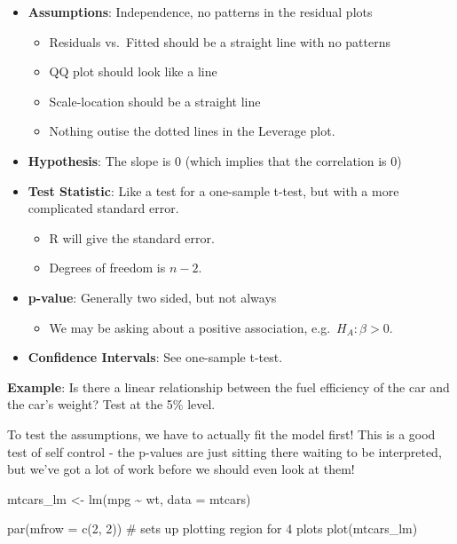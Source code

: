 \documentclass[
  letterpaper,
  DIV=11,
  numbers=noendperiod,
  oneside]{scrreprt}
\newenvironment{Shaded}{\begin{snugshade}}{\end{snugshade}}
\newcommand{\AttributeTok}[1]{\textcolor[rgb]{0.40,0.45,0.13}{#1}}
\newcommand{\CommentTok}[1]{\textcolor[rgb]{0.37,0.37,0.37}{#1}}
\newcommand{\DecValTok}[1]{\textcolor[rgb]{0.68,0.00,0.00}{#1}}
\newcommand{\FunctionTok}[1]{\textcolor[rgb]{0.28,0.35,0.67}{#1}}
\newcommand{\NormalTok}[1]{\textcolor[rgb]{0.00,0.23,0.31}{#1}}
\newcommand{\OtherTok}[1]{\textcolor[rgb]{0.00,0.23,0.31}{#1}}
\newcommand{\SpecialCharTok}[1]{\textcolor[rgb]{0.37,0.37,0.37}{#1}}
\providecommand{\tightlist}{%
  \setlength{\itemsep}{0pt}\setlength{\parskip}{0pt}}\usepackage{longtable,booktabs,array}
\begin{document}
\begin{itemize}
\tightlist
\item
  \textbf{Assumptions}: Independence, no patterns in the residual plots

  \begin{itemize}
  \tightlist
  \item
    Residuals vs.~Fitted should be a straight line with no patterns
  \item
    QQ plot should look like a line
  \item
    Scale-location should be a straight line
  \item
    Nothing outise the dotted lines in the Leverage plot.
  \end{itemize}
\item
  \textbf{Hypothesis}: The slope is 0 (which implies that the
  correlation is 0)
\item
  \textbf{Test Statistic}: Like a test for a one-sample t-test, but with
  a more complicated standard error.

  \begin{itemize}
  \tightlist
  \item
    R will give the standard error.
  \item
    Degrees of freedom is \(n-2\).
  \end{itemize}
\item
  \textbf{p-value}: Generally two sided, but not always

  \begin{itemize}
  \tightlist
  \item
    We may be asking about a positive association,
    e.g.~\(H_A:\beta > 0\).
  \end{itemize}
\item
  \textbf{Confidence Intervals}: See one-sample t-test.
\end{itemize}

\textbf{Example}: Is there a linear relationship between the fuel
efficiency of the car and the car's weight? Test at the 5\% level.

To test the assumptions, we have to actually fit the model first! This
is a good test of self control - the p-values are just sitting there
waiting to be interpreted, but we've got a lot of work before we should
even look at them!

\begin{Shaded}
\begin{Highlighting}[]
\NormalTok{mtcars\_lm }\OtherTok{\textless{}{-}} \FunctionTok{lm}\NormalTok{(mpg }\SpecialCharTok{\textasciitilde{}}\NormalTok{ wt, }\AttributeTok{data =}\NormalTok{ mtcars)}

\FunctionTok{par}\NormalTok{(}\AttributeTok{mfrow =} \FunctionTok{c}\NormalTok{(}\DecValTok{2}\NormalTok{, }\DecValTok{2}\NormalTok{)) }\CommentTok{\# sets up plotting region for 4 plots}
\FunctionTok{plot}\NormalTok{(mtcars\_lm)}
\end{Highlighting}
\end{Shaded}
\end{document}
